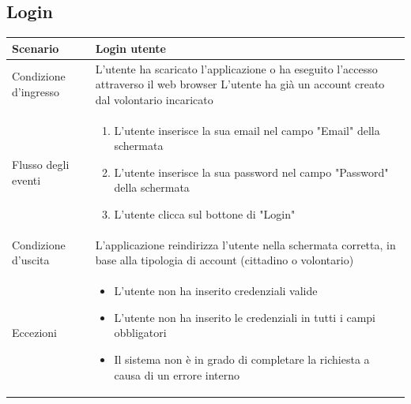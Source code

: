 \documentclass[12pt,a4paper,twoside,openright,titlepage]{book}
\begin{document}
\subsection{Login}
\begin{table}[H]
\centering
\begin{tabular}{|p{4cm}|p{10cm}|}
\hline
Scenario & Login utente \\
\hline
Condizione d'ingresso & L'utente ha scaricato l'applicazione o ha eseguito l'accesso attraverso il web browser \newline
L'utente ha già un account creato dal volontario incaricato \\
\hline
Flusso degli eventi & 
\begin{enumerate}
\item L'utente inserisce la sua email nel campo "Email" della schermata
\item L'utente inserisce la sua password nel campo "Password" della schermata
\item L'utente clicca sul bottone di "Login"
\end{enumerate}\\
\hline
Condizione d'uscita & L'applicazione reindirizza l'utente nella schermata corretta, in base alla tipologia di account (cittadino o volontario)\\
\hline
Eccezioni & 
\begin{itemize}
\item L'utente non ha inserito credenziali valide
\item L'utente non ha inserito le credenziali in tutti i campi obbligatori
\item Il sistema non è in grado di completare la richiesta a causa di un errore interno
\end{itemize} \\
\hline
\end{tabular}
\end{table}
\end{document}
